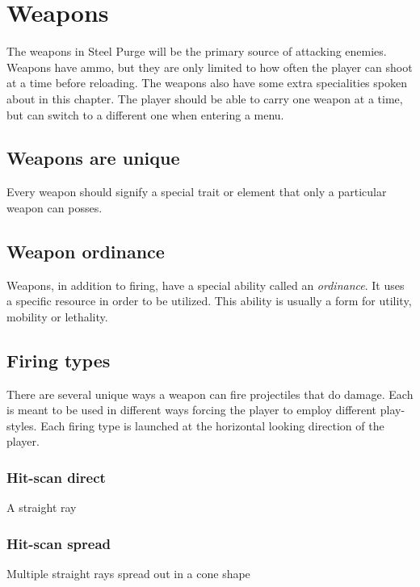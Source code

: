 \documentclass[../Main.tex]{subfiles}
\begin{document}
\section{Weapons}

The weapons in Steel Purge will be the primary source of attacking enemies. Weapons have ammo, but they are only limited to how often the player can shoot at a time before reloading. The weapons also have some extra specialities spoken about in this chapter. The player should be able to carry one weapon at a time, but can switch to a different one when entering a menu.

\subsection{Weapons are unique}

Every weapon should signify a special trait or element that only a particular weapon can posses.

\subsection{Weapon ordinance}

Weapons, in addition to firing, have a special ability called an \emph{ordinance}. It uses a specific resource in order to be utilized. This ability is usually a form for utility, mobility or lethality.

\subsection{Firing types}

There are several unique ways a weapon can fire projectiles that do damage. Each is meant to be used in different ways forcing the player to employ different play-styles. Each firing type is launched at the horizontal looking direction of the player. 

\subsubsection{Hit-scan direct}

A straight ray 

\subsubsection{Hit-scan spread}

Multiple straight rays spread out in a cone shape
\end{document}
